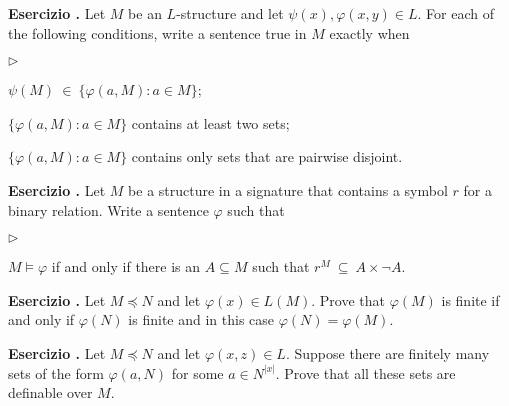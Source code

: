 \documentclass[10pt]{article}
\def\phi{\varphi}
\newcommand{\labella}[1]{{\sf\footnotesize #1}\hfill}
\renewenvironment{itemize}
  {\begin{list}{$\triangleright$}{%
   \setlength{\parskip}{0mm}
   \setlength{\topsep}{0mm}
   \setlength{\rightmargin}{0mm}
   \setlength{\listparindent}{0mm}
   \setlength{\itemindent}{0mm}
   \setlength{\labelwidth}{3ex}
   \setlength{\itemsep}{0mm}
   \setlength{\parsep}{0mm}
   \setlength{\partopsep}{0mm}
   \setlength{\labelsep}{1ex}
   \setlength{\leftmargin}{\labelwidth+\labelsep}
   \let\makelabel\labella}}{%
   \end{list}}
\newcounter{ex}
\newenvironment{exercise}{\clearpage\addtocounter{ex}{1}\textbf{Esercizio \theex.\quad}}{}
\begin{document}
\clearpage%


\begin{exercise}
  Let $M$ be an $L$-structure and let $\psi(x), \phi(x,y)\in L$. For each of the following conditions, write a sentence true in $M$ exactly when
  \begin{itemize}
  \item[a.] $\psi(M)\ \in\ \big\{\phi(a,M): a\in M\big\}$;
  \item[b.] $\big\{\phi(a,M): a\in M\big\}$ contains at least two sets;
  \item[c.] $\big\{\phi(a,M): a\in M\big\}$ contains only sets that are pairwise disjoint.
  \end{itemize}
  \end{exercise}
  
  \begin{exercise}
  Let $M$ be a structure in a signature that contains a symbol $r$ for a binary relation.
  Write a sentence $\phi$ such that 
  \begin{itemize} 
  \item[a.] $M\models\phi$ if and only if there is an $A\subseteq M$ such that $r^M\ \subseteq\ A\times\neg A$.
  \end{itemize}
  \end{exercise}
  

\begin{exercise}
  Let $M\preceq N$ and let $\phi(x)\in L(M)$.
  Prove that $\phi(M)$ is finite if and only if $\phi(N)$ is finite and in this case $\phi(N)=\phi(M)$.
  \end{exercise}
  
  \begin{exercise}
  Let $M\preceq N$ and let $\phi(x,z)\in L$.
  Suppose there are finitely many sets of the form $\phi(a,N)$ for some $a\in N^{|x|}$.
  Prove that all these sets are definable over $M$.
  \end{exercise}
\end{document}
